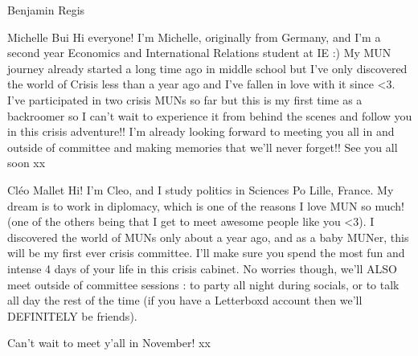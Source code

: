 \begin{chairletter}{Benjamin Regis}
\end{chairletter}

\begin{chairletter}{Michelle Bui}
Hi everyone! I’m Michelle, originally from Germany, and I’m a second year Economics and International Relations student at IE :) My MUN journey already started a long time ago in middle school but I’ve only discovered the world of Crisis less than a year ago and I’ve fallen in love with it since <3. I’ve participated in two crisis MUNs so far but this is my first time as a backroomer so I can’t wait to experience it from behind the scenes and follow you in this crisis adventure!! I’m already looking forward to meeting you all in and outside of committee and making memories that we’ll never forget!! See you all soon xx

\end{chairletter}

\begin{chairletter}{Cléo Mallet}
Hi! I'm Cleo, and I study politics in Sciences Po Lille, France. My dream is to work in diplomacy, which is one of the reasons I love MUN so much! (one of the others being that I get to meet awesome people like you <3). I discovered the world of MUNs only about a year ago, and as a baby MUNer, this will be my first ever crisis committee. I'll make sure you spend the most fun and intense 4 days of your life in this crisis cabinet. No worries though, we'll ALSO meet outside of committee sessions : to party all night during socials, or to talk all day the rest of the time (if you have a Letterboxd account then we'll DEFINITELY be friends).

Can't wait to meet y'all in November! xx

\end{chairletter}
